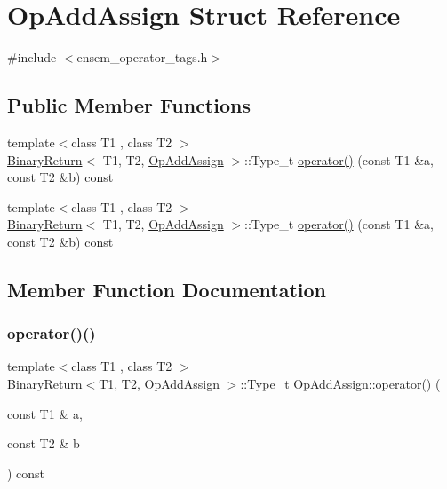 \hypertarget{structOpAddAssign}{}\section{Op\+Add\+Assign Struct Reference}
\label{structOpAddAssign}


{\ttfamily \#include $<$ensem\+\_\+operator\+\_\+tags.\+h$>$}

\subsection*{Public Member Functions}
\begin{DoxyCompactItemize}
\item 
{\footnotesize template$<$class T1 , class T2 $>$ }\\\mbox{\hyperlink{structBinaryReturn}{Binary\+Return}}$<$ T1, T2, \mbox{\hyperlink{structOpAddAssign}{Op\+Add\+Assign}} $>$\+::Type\+\_\+t \mbox{\hyperlink{structOpAddAssign_a804d22e657d15e33feee3d78d8d9f2a4}{operator()}} (const T1 \&a, const T2 \&b) const
\item 
{\footnotesize template$<$class T1 , class T2 $>$ }\\\mbox{\hyperlink{structBinaryReturn}{Binary\+Return}}$<$ T1, T2, \mbox{\hyperlink{structOpAddAssign}{Op\+Add\+Assign}} $>$\+::Type\+\_\+t \mbox{\hyperlink{structOpAddAssign_a804d22e657d15e33feee3d78d8d9f2a4}{operator()}} (const T1 \&a, const T2 \&b) const
\end{DoxyCompactItemize}


\subsection{Member Function Documentation}
\mbox{\label{structOpAddAssign_a804d22e657d15e33feee3d78d8d9f2a4}} 
\subsubsection{\texorpdfstring{operator()()}{operator()()}\hspace{0.1cm}{\footnotesize\ttfamily [1/2]}}
{\footnotesize\ttfamily template$<$class T1 , class T2 $>$ \\
\mbox{\hyperlink{structBinaryReturn}{Binary\+Return}}$<$T1, T2, \mbox{\hyperlink{structOpAddAssign}{Op\+Add\+Assign}} $>$\+::Type\+\_\+t Op\+Add\+Assign\+::operator() (\begin{DoxyParamCaption}\item[{const T1 \&}]{a,  }\item[{const T2 \&}]{b }\end{DoxyParamCaption}) const\hspace{0.3cm}{\ttfamily [inline]}}

